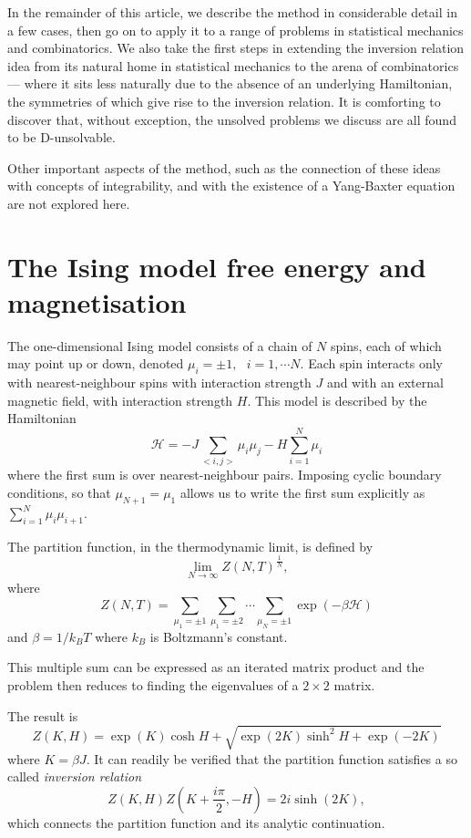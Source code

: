 In the remainder of this article, we describe the method
in considerable detail in a few cases, then go on to apply
it to a range of problems in statistical mechanics and
combinatorics. We also take the first steps in extending
the inversion relation idea from its natural home in
statistical mechanics to the arena of combinatorics --- where
it sits less naturally due to the absence of an underlying
Hamiltonian, the symmetries of which give rise to the
inversion relation.
It is comforting to discover that, without exception, the
unsolved problems we discuss are all found to be D-unsolvable.

Other important aspects of the method, such as the connection of these
ideas with concepts of integrability,  and with the existence of
a Yang-Baxter equation are not explored here.

\section{The Ising model free energy and magnetisation}
\label{Ising}

The one-dimensional Ising model consists of a chain of $N$ spins, each
of which may point up or down,  denoted
$\mu_i=\pm 1, \mbox{  } i=1,\cdots N.$  Each spin interacts 
only
with nearest-neighbour spins with interaction strength $J$
and with an external magnetic field, with interaction strength $H.$
This model is described \cite{Tho} by the Hamiltonian
\begin{equation}
{\mathcal H} = -J \sum_{<i,j>} \mu_i \mu_j - H\sum_{i=1}^N \mu_i 
\end{equation}
where the first sum is over nearest-neighbour pairs. Imposing cyclic
boundary conditions, so that $\mu_{N+1} = \mu_1$ allows us to write
the first sum explicitly as $\sum_{i=1}^N \mu_i \mu_{i+1}.$

The partition function, in the thermodynamic limit, is defined by
$$\lim_{N \rightarrow \infty} Z(N,T)^{\frac{1}{N}},$$
where
$$Z(N,T) = \sum_{\mu_1=\pm 1}  \sum_{\mu_1=\pm 2} \cdots
\sum_{\mu_N=\pm 1} \exp(-\beta {\mathcal H}) $$
and $\beta = 1/k_BT$ where $k_B$ is Boltzmann's constant.

This multiple sum can be expressed as an iterated matrix product \cite{Tho}
and the problem then reduces to finding the eigenvalues of a $2 \times 2$ matrix.

The result is
\begin{equation}
Z(K,H) = \exp(K)\cosh H + \sqrt{\exp(2K)\sinh^2H + \exp(-2K)}
\end{equation}
where $K = \beta J.$ It can readily be verified that the partition
function satisfies a so called {\em inversion relation}
\begin{equation}
Z(K,H)Z(K+\frac{i\pi}{2},-H) = 2i\sinh(2K),
\end{equation}
which connects the partition function and its analytic continuation.

